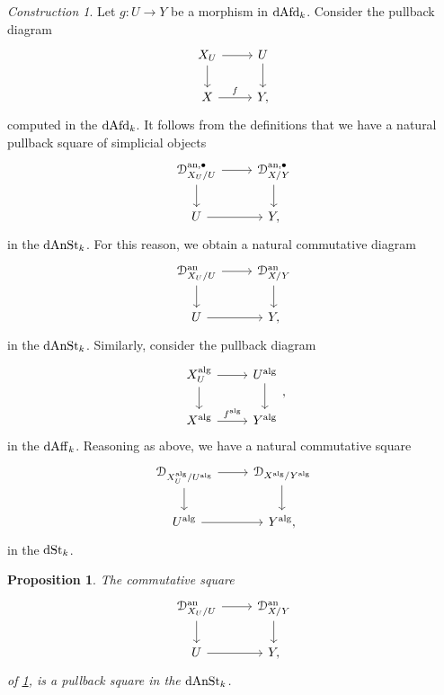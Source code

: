 \documentclass[10pt,a4paper,reqno]{amsart} %
\theoremstyle{plain}
\newtheorem{prop}[thm]{Proposition}
\theoremstyle{definition}
\theoremstyle{remark}
\numberwithin{equation}{section}
\newtheorem{construction}[thm]{Construction}
\begin{document}
\begin{construction} \label{const:pullbacks_of_deformations}
    Let $g \colon U \to Y$ be a morphism in $\mathrm{dAfd}_k$. Consider the pullback diagram
        \[
        \begin{tikzcd}
            X_U \ar{r} \ar{d} & U \ar{d} \\
            X \ar{r}{f} & Y,  
        \end{tikzcd}
        \]
    computed in the \infcat $\mathrm{dAfd}_k$. It follows from the definitions that we have a natural pullback square of simplicial objects
        \[
        \begin{tikzcd}
            \cD_{X_U/ U}^{\mathrm{an}, \bullet} \ar{r} \ar{d} & \cD_{X/Y}^{\mathrm{an}, \bullet} \ar{d} \\
            U \ar{r} & Y,
        \end{tikzcd}
        \]
    in the \infcat $\mathrm{dAnSt}_k$. For this reason, we obtain a natural commutative diagram
        \[
        \begin{tikzcd}
            \cD_{X_U/ U}\an \ar{r} \ar{d} & \cD_{X/ Y} \an \ar{d} \\
            U \ar{r} & Y,
        \end{tikzcd}
        \]
    in the \infcat $\mathrm{dAnSt}_k$. Similarly, consider the pullback diagram
        \[
        \begin{tikzcd}
            X_U\alg \ar{r} \ar{d} & U \alg \ar{d} \\
            X\alg \ar{r}{f\alg} & Y\alg
        \end{tikzcd},
        \]
    in the \infcat $\mathrm{dAff}_k$. Reasoning as above, we have a natural commutative square
      \[
        \begin{tikzcd}
        \cD_{X_U\alg/ U\alg} \ar{r} \ar{d} & \cD_{X\alg/ Y\alg} \ar{d} \\
        U\alg \ar{r} & Y \alg,  
       \end{tikzcd}
      \]
    in the \infcat $\mathrm{dSt}_k$.
\end{construction}

\begin{prop} \label{prop:gluing_the_deformation}
    The commutative square
        \[
        \begin{tikzcd}
            \cD_{X_U/ U}\an \ar{r} \ar{d} & \cD_{X/ Y} \an \ar{d} \\
            U \ar{r} & Y, 
        \end{tikzcd}
        \]
    of \cref{const:pullbacks_of_deformations}, is a pullback square in the \infcat $\mathrm{dAnSt}_k$.
\end{prop}
\end{document}
